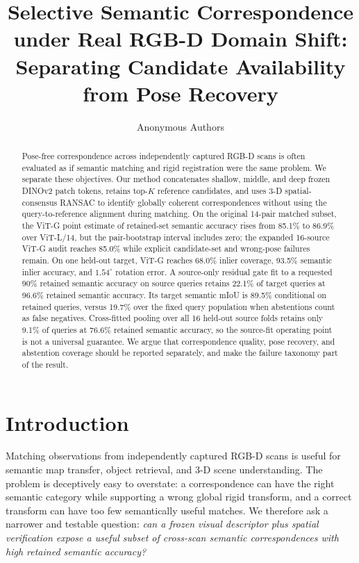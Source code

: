 \documentclass[10pt,twocolumn]{article}
\title{Selective Semantic Correspondence under Real RGB-D Domain Shift: \\
Separating Candidate Availability from Pose Recovery}
\author{Anonymous Authors}
\date{}
\begin{document}
\maketitle

\begin{abstract}
Pose-free correspondence across independently captured RGB-D scans is often
evaluated as if semantic matching and rigid registration were the same problem.
We separate these objectives. Our method concatenates shallow, middle, and deep
frozen DINOv2 patch tokens, retains top-$K$ reference candidates, and uses 3-D
spatial-consensus RANSAC to identify globally coherent correspondences without
using the query-to-reference alignment during matching. On the original
14-pair matched subset, the ViT-G point estimate of retained-set semantic
accuracy rises from 85.1\% to 86.9\% over ViT-L/14, but the pair-bootstrap
interval includes zero; the expanded 16-source ViT-G audit reaches 85.0\%
while explicit candidate-set and wrong-pose failures remain.
On one held-out target, ViT-G reaches 68.0\%
inlier coverage, 93.5\% semantic inlier accuracy, and $1.54^\circ$ rotation
error. A source-only residual gate fit to a requested 90\% retained semantic
accuracy on source queries retains 22.1\% of target queries at 96.6\% retained
semantic accuracy.
Its target semantic mIoU is 89.5\% conditional on retained queries, versus
19.7\% over the fixed query population when abstentions count as false negatives.
Cross-fitted
pooling over all 16 held-out source folds retains only 9.1\% of queries at
76.6\% retained semantic accuracy, so the source-fit operating point is not a
universal guarantee.
We argue that correspondence quality, pose recovery, and abstention coverage
should be reported separately, and make the failure taxonomy part of the
result.
\end{abstract}

\section{Introduction}

Matching observations from independently captured RGB-D scans is useful for
semantic map transfer, object retrieval, and 3-D scene understanding. The
problem is deceptively easy to overstate: a correspondence can have the right
semantic category while supporting a wrong global rigid transform, and a
correct transform can have too few semantically useful matches. We therefore
ask a narrower and testable question:
\emph{can a frozen visual descriptor plus spatial verification expose a useful
subset of cross-scan semantic correspondences with high retained semantic accuracy?}
\end{document}
